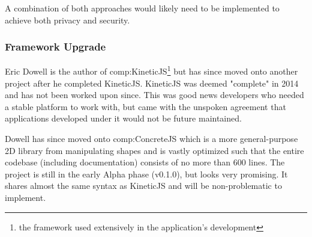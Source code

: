 A combination of both approaches would likely need to be implemented to achieve both privacy and security.


\subsubsection{Framework Upgrade}

Eric Dowell is the author of \gls{comp:KineticJS}\footnote{the framework used extensively in the application's development} but has since moved onto another project after he completed KineticJS. KineticJS was deemed "complete" in 2014 \cite{kinetictar} and has not been worked upon since. This was good news developers who needed a stable platform to work with, but came with the unspoken agreement that applications developed under it would not be future maintained.

Dowell has since moved onto \gls{comp:ConcreteJS} \cite{concretejs} which is a more general-purpose 2D library from manipulating shapes and is vastly optimized such that the entire codebase (including documentation) consists of no more than 600 lines. The project is still in the early Alpha phase (v0.1.0), but looks very promising. It shares almost the same syntax as KineticJS and will be non-problematic to implement.

